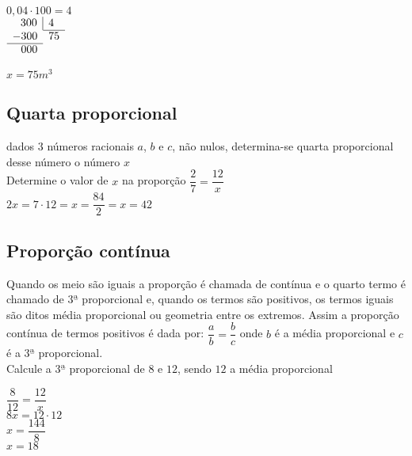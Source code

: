 \begin{enumerate}
\begin{multicols}{3}
\columnbreak
$ 0,04 \cdot 100 = 4 $\\
\columnbreak
$
\begin{array}{l l r r}
\multicolumn{2}{r}{300} \vline & \multicolumn{2}{l}{4} \\ \cline{3-4}
\multicolumn{2}{l}{-300} & \multicolumn{2}{l}{75} \\ \cline{1-2}
\multicolumn{2}{r}{000} &  \\
\end{array}
$
\end{multicols}

$ x = 75m^3 $

\subsection{Quarta proporcional}

dados $ 3 $ números racionais $ a $, $ b $ e $ c $, não nulos, determina-se quarta proporcional desse número o número $ x $\\
Determine o valor de $ x $ na proporção $ \dfrac{2}{7} = \dfrac{12}{x} $\\

$ 2x = 7 \cdot 12 = x =  \dfrac{84}{2} = x = 42 $

\subsection{Proporção contínua}

Quando os meio são iguais a proporção é chamada de contínua e o quarto termo é chamado de $ 3ª $ proporcional e, quando os termos são positivos, os termos iguais são ditos média proporcional ou geometria entre os extremos. Assim a proporção contínua de termos positivos é dada por: $ \dfrac{a}{b} = \dfrac{b}{c} $ onde $ b $ é a média proporcional e $ c $ é a $ 3ª $ proporcional.\\

Calcule a $ 3ª $ proporcional de $ 8 $ e $ 12 $, sendo $ 12 $ a média proporcional\\

\begin{multicols}{3}
	$ \dfrac{8}{12} = \dfrac{12}{x}$\\
	
	$8x = 12 \cdot 12$\\	
	
	$x = \dfrac{144}{8}$\\
	
	$x = 18$\\
	

\end{multicols}
\end{enumerate}
